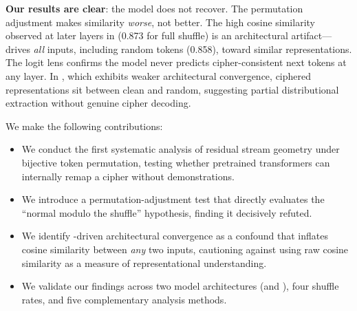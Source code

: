 {\bf Our results are clear}: the model does not recover. The permutation adjustment makes similarity \emph{worse}, not better. The high cosine similarity observed at later layers in \gpttwo (0.873 for full shuffle) is an architectural artifact---\layernorm drives \emph{all} inputs, including random tokens (0.858), toward similar representations. The logit lens confirms the model never predicts cipher-consistent next tokens at any layer. In \pythia, which exhibits weaker architectural convergence, ciphered representations sit between clean and random, suggesting partial distributional extraction without genuine cipher decoding.

We make the following contributions:
\begin{itemize}[leftmargin=*,itemsep=0pt,topsep=0pt]
    \item We conduct the first systematic analysis of residual stream geometry under bijective token permutation, testing whether pretrained transformers can internally remap a cipher without demonstrations.
    \item We introduce a permutation-adjustment test that directly evaluates the ``normal modulo the shuffle'' hypothesis, finding it decisively refuted.
    \item We identify \layernorm-driven architectural convergence as a confound that inflates cosine similarity between \emph{any} two inputs, cautioning against using raw cosine similarity as a measure of representational understanding.
    \item We validate our findings across two model architectures (\gpttwo and \pythia), four shuffle rates, and five complementary analysis methods.
\end{itemize}
